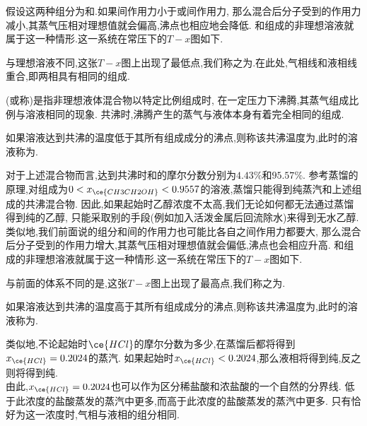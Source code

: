 \documentclass{ctexart}
\begin{document}
假设这两种组分为和.如果间作用力小于或间作用力,%
那么混合后分子受到的作用力减小,其蒸气压相对理想值就会偏高,沸点也相应地会降低.%
和组成的非理想溶液就属于这一种情形.这一系统在常压下的$T-x$图如下.
\begin{figure}[H]
    \centering
\end{figure}
与理想溶液不同,这张$T-x$图上出现了最低点,我们称之为.在此处,气相线和液相线重合,即两相具有相同的组成.
\begin{definition}[4D.2.1 共沸]
    (或称)是指非理想液体混合物以特定比例组成时,%
    在一定压力下沸腾,其蒸气组成比例与溶液相同的现象.%
    共沸时,沸腾产生的蒸气与液体本身有着完全相同的组成.
\end{definition}
\begin{definition}[4D.2.2 最低共沸点]
    如果溶液达到共沸的温度低于其所有组成成分的沸点,则称该共沸温度为,此时的溶液称为.
\end{definition}
对于上述混合物而言,达到共沸时和的摩尔分数分别为$4.43\%$和$95.57\%$.%
参考蒸馏的原理,对组成为$0<x_{\ce{CH3CH2OH}}<0.9557$的溶液,蒸馏只能得到纯蒸汽和上述组成的共沸混合物.%
因此,如果起始时乙醇浓度不太高,我们无论如何都无法通过蒸馏得到纯的乙醇,%
只能采取别的手段(例如加入活泼金属后回流除水)来得到无水乙醇.\\
\indent 类似地,我们前面说的组分和间的作用力也可能比各自之间作用力都要大,%
那么混合后分子受到的作用力增大,其蒸气压相对理想值就会偏低,沸点也会相应升高.%
和组成的非理想溶液就属于这一种情形.这一系统在常压下的$T-x$图如下.
\begin{center}
    
\end{center}
与前面的体系不同的是,这张$T-x$图上出现了最高点,我们称之为.
\begin{definition}[4D.2.3 最高共沸点]
    如果溶液达到共沸的温度高于其所有组成成分的沸点,则称该共沸温度为,此时的溶液称为.
\end{definition}
类似地,不论起始时$\ce{HCl}$的摩尔分数为多少,在蒸馏后都将得到$x_{\ce{HCl}}=0.2024$的蒸汽.%
如果起始时$x_{\ce{HCl}}<0.2024$,那么液相将得到纯,反之则将得到纯.\\
\indent 由此,$x_{\ce{HCl}}=0.2024$也可以作为区分稀盐酸和浓盐酸的一个自然的分界线.%
低于此浓度的盐酸蒸发的蒸汽中更多,而高于此浓度的盐酸蒸发的蒸汽中更多.%
只有恰好为这一浓度时,气相与液相的组分相同.
\end{document}

